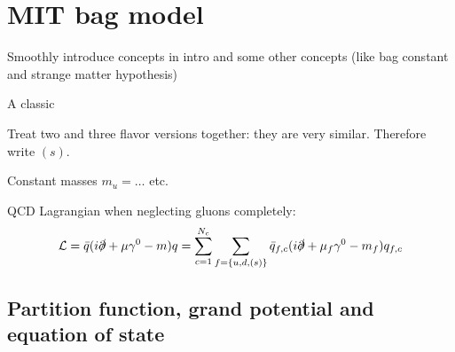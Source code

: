 \chapter{MIT bag model}

Smoothly introduce concepts in intro and some other concepts (like bag constant and strange matter hypothesis)

A classic

Treat two and three flavor versions together: they are very similar.
Therefore write $(s)$.

Constant masses $m_u = \ldots$ etc.

QCD Lagrangian when neglecting gluons completely:
\begin{equation}
	\mathcal{L} = \bar{q} (i \slashed\partial + \mu \gamma^0 - m) q
	      = \sum_{c=1}^{N_c} \sum_{f=\{u,d,(s)\}} \bar{q}_{f,c} (i \slashed\partial + \mu_f \gamma^0 - m_f) q_{f,c}
\label{eq:mit:lagrangian}
\end{equation}

\section{Partition function, grand potential and equation of state}

